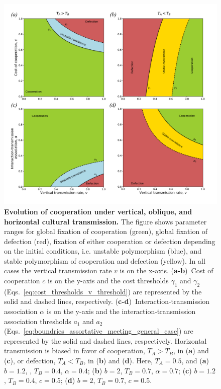 \documentclass[12pt]{extarticle}
\begin{document}
\begin{figure}[p]
  \centering       
    \includegraphics[width=1\textwidth]{../PRSB_figures/fig_3.pdf}
    \caption{\textbf{Evolution of cooperation under vertical, oblique, and horizontal cultural transmission.} 
    The figure shows parameter ranges for global fixation of cooperation (green), global fixation of defection (red), fixation of either cooperation or defection depending on the initial conditions, i.e. unstable polymorphism (blue), and stable polymorphism of cooperation and defection (yellow).
	In all cases the vertical transmission rate $v$ is on the x-axis.
	(\textbf{a-b})~Cost of cooperation $c$ is on the y-axis and the cost thresholds $\gamma_1$ and $\gamma_2$ (Eqs.~\ref{eq:cost_thresholds_v_threshold}) are represented by the solid and dashed lines, respectively. 
    (\textbf{c-d})~Interaction-transmission association $\alpha$ is on the y-axis and the interaction-transmission association thresholds $a_1$ and $a_2$ (Eqs.~\ref{eq:boundries_assortative_meeting_general_case}) are represented by the solid and dashed lines, respectively. 
    Horizontal transmission is biased in favor of cooperation, $T_A>T_B$, in (\textbf{a}) and (\textbf{c}), or defection, $T_A<T_B$, in (\textbf{b}) and (\textbf{d}).    
    Here, $T_A = 0.5$, and
    (\textbf{a}) $b=1.2$, , $T_B = 0.4$, $\alpha = 0.4$;
    (\textbf{b}) $b=2$, $T_B = 0.7$, $\alpha = 0.7$;
    (\textbf{c}) $b=1.2$, $T_B = 0.4$, $c=0.5$;
    (\textbf{d}) $b=2$, $T_B = 0.7$, $c=0.5$.
    }
    \label{fig:equilibria}
\end{figure}
\end{document}
